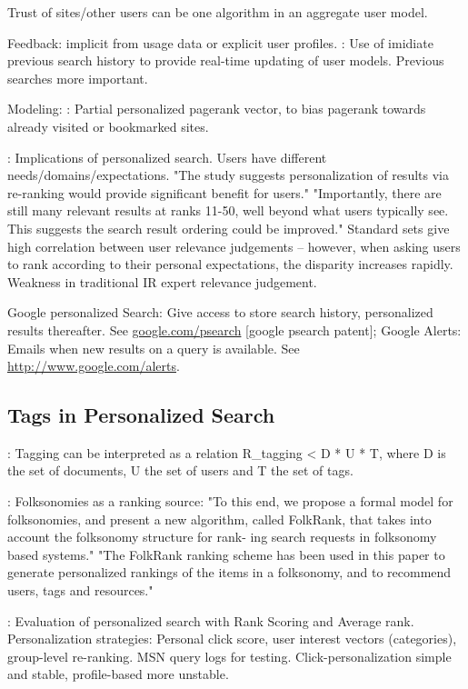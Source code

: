 Trust of sites/other users can be one algorithm in an aggregate user model.

Feedback: 
\cite[p9]{Micarelli2007} implicit from usage data or explicit user profiles. 
\cite{Shen2005}: Use of imidiate previous search history to provide real-time updating of user models. Previous searches more important.

Modeling:
\cite{Jeh2003}: Partial personalized pagerank vector, to bias pagerank towards already visited or bookmarked sites.

\cite[p2]{Teevan2005a}: Implications of personalized search. Users have different needs/domains/expectations.
"The study suggests personalization of results via re-ranking would provide significant benefit for users."
"Importantly, there are still many relevant results at ranks 11-50, well beyond what users typically see. 
This suggests the search result ordering could be improved."
Standard sets give high correlation between user relevance judgements -- however, when asking users
to rank according to their personal expectations, the disparity increases rapidly. Weakness in 
traditional IR expert relevance judgement.

Google personalized Search: Give access to store search history, personalized results thereafter. See \url{google.com/psearch} [google psearch patent]; 
Google Alerts: Emails when new results on a query is available. See \url{http://www.google.com/alerts}.

\subsection{Tags in Personalized Search}

\cite[p4]{Noll2007}: 
Tagging can be interpreted as a relation R\_tagging < D * U * T, where D is the set of documents, U the set of users and T the set of tags.

\cite[p2]{Hotho}: Folksonomies as a ranking source: 
"To this end, we propose a formal model for folksonomies, and present a new algorithm, called FolkRank, that takes into account the folksonomy structure for rank- ing search requests in folksonomy based systems."
"The FolkRank ranking scheme has been used in this paper to generate personalized rankings of the items in a folksonomy, and to recommend users, tags and resources."

\cite{Dou2007}: Evaluation of personalized search with Rank Scoring and Average rank. 
Personalization strategies: Personal click score, user interest vectors (categories), 
group-level re-ranking. MSN query logs for testing. Click-personalization simple and stable, 
profile-based more unstable.

